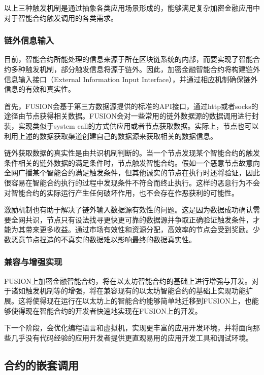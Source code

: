\documentclass[a4paper,12pt]{article}
\begin{document}
以上三种触发机制是通过抽象各类应用场景形成的，能够满足复杂加密金融应用中对于智能合约触发调用的各类需求。

\subsubsection{链外信息输入}

目前，智能合约所能处理的信息来源于所在区块链系统的内部，而要实现了智能合约多种触发机制，部分触发信息将源于链外。因此，加密金融智能合约将构建链外信息输入接口（External Information Input Interface），并通过相应机制确保链外信息的有效和真实性。

首先，FUSION会基于第三方数据源提供的标准的API接口，通过http或者socks的途径由节点获得相关数据。FUSION会对一些常用的链外数据源的数据调用进行封装，实现类似于system call的方式供应用或者节点获取数据。实际上，节点也可以利用上述的数据获取渠道创建自己的数据源来获取相关的数据信息。

链外获取数据的真实性是由共识机制判断的。当一个节点发现某个智能合约的触发条件相关的链外数据的满足条件时，节点触发智能合约。假如一个恶意节点故意向全网广播某个智能合约满足触发条件，但其他诚实的节点在执行时还将验证，因此很容易在智能合约执行的过程中发现条件不符合而终止执行。这样的恶意行为不会对智能合约的实际运行产生任何破坏作用，也不会存在作恶获利的可能性。

激励机制也有助于解决了链外输入数据源有效性的问题。这是因为数据成功确认需要全网共识，节点只有设法找寻更快更可靠的数据源并争取正确验证触发条件，才能为其带来更多收益。通过市场有效性和资源分配，高效率的节点会受到奖励。少数恶意节点捏造的不真实的数据难以影响最终的数据真实性。

\subsubsection{兼容与增强实现}

FUSION上加密金融智能合约，将在以太坊智能合约的基础上进行增强与开发。对于诸如触发机制等的增强，将在兼容现有的以太坊智能合约的基础上实现功能扩展。这将使得现在运行在以太坊上的智能合约能够简单地迁移到FUSION上，也能够使得现在智能合约的开发者快速地实现在FUSION上的开发。

下一个阶段，会优化编程语言和虚拟机，实现更丰富的应用开发环境，并将面向那些几乎没有代码经验的应用开发者提供更直观易用的应用开发工具和调试环境。

\subsection{合约的嵌套调用}
\end{document}
